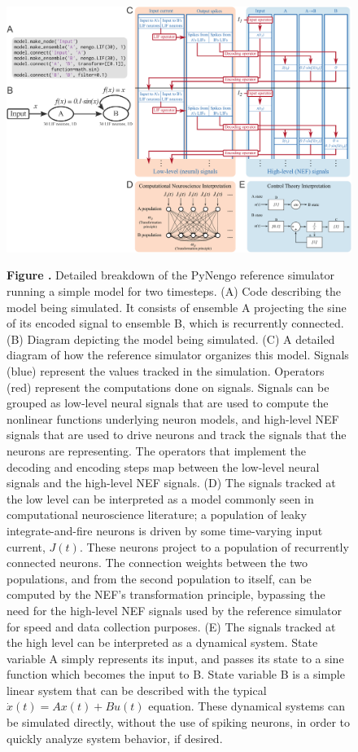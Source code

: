 \documentclass{frontiersSCNS}
\begin{document}
\begin{figure}
\begin{center}
  \includegraphics[width=\textwidth]{sim}
\end{center}
 \textbf{\label{fig:sim} Figure .}{
   Detailed breakdown of the PyNengo reference simulator
   running a simple model for two timesteps.
   (A) Code describing the model being simulated.
   It consists of ensemble A projecting the sine of its
   encoded signal to ensemble B,
   which is recurrently connected.
   (B) Diagram depicting the model being simulated.
   (C) A detailed diagram of how the reference simulator
   organizes this model. Signals (blue) represent the values
   tracked in the simulation.
   Operators (red) represent the computations done on signals.
   Signals can be grouped as low-level neural signals
   that are used to compute the nonlinear functions
   underlying neuron models,
   and high-level NEF signals that are used to
   drive neurons and track the signals
   that the neurons are representing.
   The operators that implement the decoding
   and encoding steps map between
   the low-level neural signals
   and the high-level NEF signals.
   (D) The signals tracked at the low level
   can be interpreted as a model
   commonly seen in computational neuroscience literature;
   a population of leaky integrate-and-fire neurons
   is driven by some time-varying input current, $J(t)$.
   These neurons project to a population
   of recurrently connected neurons.
   The connection weights between the two populations,
   and from the second population to itself,
   can be computed by the NEF's transformation
   principle, bypassing the need for
   the high-level NEF signals
   used by the reference simulator
   for speed and data collection purposes.
   (E) The signals tracked at the high level
   can be interpreted as a dynamical system.
   State variable A simply represents its input,
   and passes its state to a sine function
   which becomes the input to B.
   State variable B is a simple linear system
   that can be described with the typical
   $\dot{x}(t) = A x(t) + B u(t)$ equation.
   These dynamical systems can be simulated
   directly, without the use of spiking neurons,
   in order to quickly analyze system behavior,
   if desired.}
\end{figure}
\end{document}
